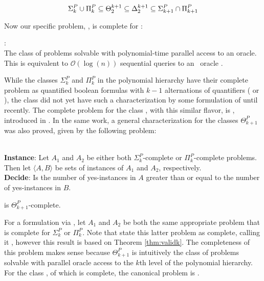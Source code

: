 $$\Sigma^{P}_{k} \cup \Pi^{P}_{k} \subseteq
    \Theta^{k+1}_2 \subseteq \Delta^{k+1}_2
    \subseteq \Sigma^{P}_{k+1} \cap \Pi^{P}_{k+1}$$

Now our specific problem, \dwin, is complete for \tp:

\begin{defn}{\tp:} \\
    The class of problems solvable with polynomial-time parallel access to an
    \np oracle.
    This is equivalent to $\mathcal{O}(\log(n))$ sequential queries to an
\np~oracle \citep{hem87, ksw87}.
\end{defn}

While the classes $\Sigma^P_k$ and $\Pi^P_k$ in the polynomial hierarchy
have their complete problem as quantified boolean formulas with $k-1$
alternations of quantifiers ( or ),
the class \tp did not yet have such a characterization by some formulation
of  until recently.
The complete problem for the class \tp, with this similar flavor, is
\csat, introduced in \citet{csatintro}.
In the same work, a general characterization for the classes
$\Theta_{k+1}^P$ was also proved, given by the following problem:


\begin{problem}{} \citep{compsat} \\
    \tab \textbf{Instance}: Let $A_1$ and $A_2$ be either both $\Sigma_k^P$-complete
or $\Pi_k^P$-complete problems.
    Then let $\langle A,B \rangle$ be sets of instances of $A_1$ and
    $A_2$, respectively.\\
    \tab \textbf{Decide}: Is the number of yes-instances in $A$
    greater than or equal to the number of yes-instances in $B$.
\end{problem}

\begin{theorem}\label{thm:validk} \citep{compsat}
     is $\Theta_{k+1}^P$-complete.
\end{theorem}

For a formulation via , let $A_1$ and $A_2$ be
both the
same appropriate  problem that is complete for
$\Sigma_k^P$ or $\Pi_k^P$.
Note that \citet{compsat} state this latter problem as complete,
calling it , however this result is based on Theorem
\ref{thm:validk}.
The completeness of this problem makes sense because
$\Theta_{k+1}^P$ is intuitively the
class of problems solvable with parallel oracle access to the $k$th level of
the polynomial hierarchy.
For the class \tp, of which \dwin is complete, the canonical problem is \csat.

